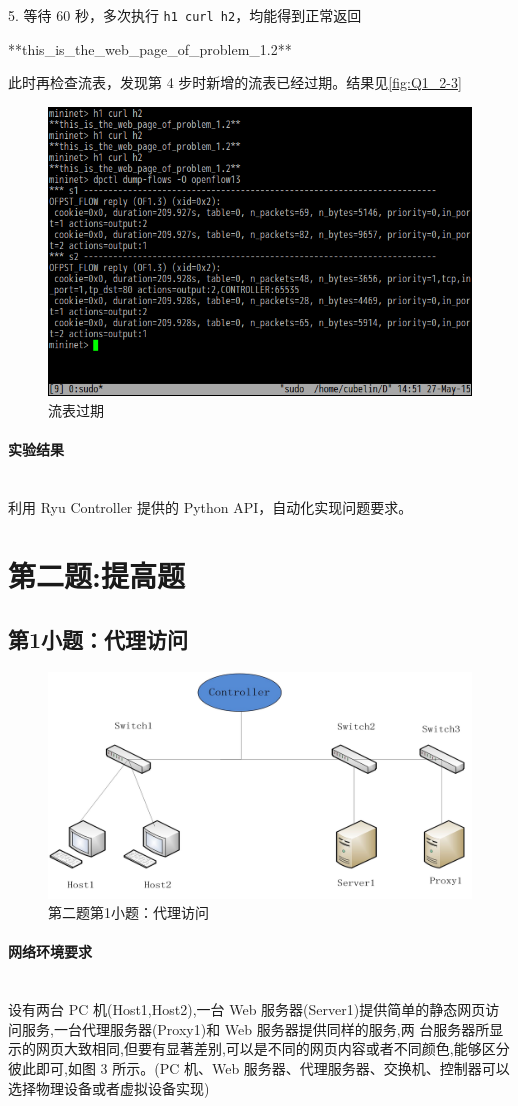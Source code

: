 \documentclass[format=draft,language=chinese,category=SDN]{hustreport}
\newcommand{\myparagraph}[1]{\paragraph{#1}\mbox{}\\}
\newcommand{\code}{\texttt}
\begin{document}
5. 等待 60 秒，多次执行 \code{h1 curl h2}，均能得到正常返回
\begin{center}
**this\_is\_the\_web\_page\_of\_problem\_1.2**
\end{center}
此时再检查流表，发现第 4 步时新增的流表已经过期。结果见\autoref{fig:Q1_2-3}

\begin{figure}[!h]
\centering
\includegraphics[width=.618\textwidth]{fig/1_2-3.png}
\caption{流表过期}\label{fig:Q1_2-3}
\end{figure}

\myparagraph{实验结果}

利用 Ryu Controller 提供的 Python API，自动化实现问题要求。

\section{第二题:提高题}\label{sec:Q2}
\subsection{第1小题：代理访问}\label{sec:Q2_1}

\begin{figure}[!h]
\centering
\includegraphics[width=.618\textwidth]{fig/2_1-0.png}
\caption{第二题第1小题：代理访问}\label{fig:Q2_1-0}
\end{figure}

\myparagraph{网络环境要求}

设有两台 PC 机(Host1,Host2),一台 Web 服务器(Server1)提供简单的静态网页访问服务,一台代理服务器(Proxy1)和 Web 服务器提供同样的服务,两
台服务器所显示的网页大致相同,但要有显著差别,可以是不同的网页内容或者不同颜色,能够区分彼此即可,如图 3 所示。(PC 机、Web 服务器、代理服务器、交换机、控制器可以选择物理设备或者虚拟设备实现)
\end{document}
